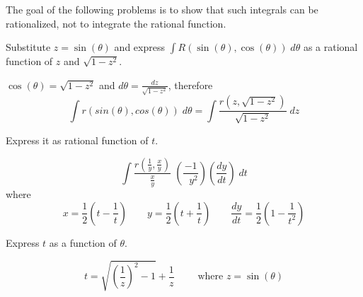 The goal of the following problems is to show that such integrals
can be rationalized, not to integrate the rational function.

\problem Substitute $z=\sin(\theta)$ and express $\int
R(\sin(\theta), \cos(\theta))\;d\theta$ as a rational function of $z$ and
$\sqrt{1-z^2}$.

\answer
$\cos(\theta)=\sqrt{1-z^2}$ and
$d\theta =\frac{dz}{\sqrt{1-z^2}}$, therefore
\[
\int r(sin(\theta),cos(\theta))\; d\theta=\int
\frac{r(z,\sqrt{1-z^2})}{\sqrt{1-z^2}}\;dz
\]
\endanswer

\problem Express it as rational function of $t$.

\answer
\[\int\frac{r(\frac1y,\frac{x}y)}{\frac{x}y}\;(\frac{-1}{\;\;y^2})
(\frac{dy}{dt})\;dt\]
where
\[ x=\frac12(t-\frac1t) \qquad y=\frac12(t+\frac1t)
\qquad \frac{dy}{dt}=\frac12(1-\frac1{t^2})\]
\endanswer

\problem Express $t$ as a function of $\theta$.

\answer
\[
t=\sqrt{(\frac1z)^2-1}+\frac1z \qquad \mbox{ where } z=\sin(\theta)
\]
\endanswer
